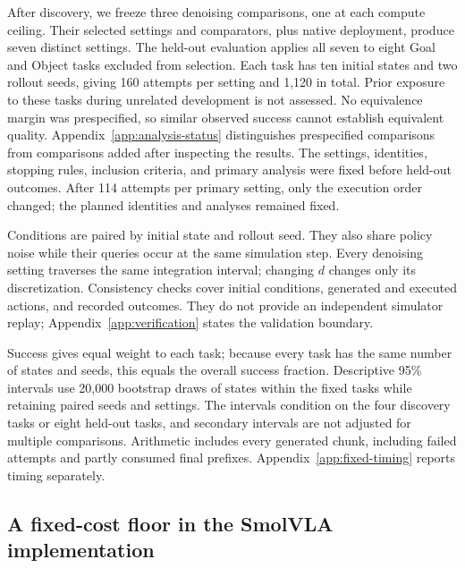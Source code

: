 \documentclass{article}
\begin{document}
After discovery, we freeze three denoising comparisons, one at each compute
ceiling. Their selected settings and comparators, plus native deployment, produce
seven distinct settings. The held-out evaluation applies all seven to eight Goal and
Object tasks excluded from selection. Each task has ten initial states and two
rollout seeds, giving 160 attempts per setting and 1,120 in total. Prior exposure
to these tasks during unrelated development is not assessed. No equivalence
margin was prespecified, so similar observed success cannot establish equivalent
quality. Appendix~\ref{app:analysis-status} distinguishes prespecified
comparisons from comparisons added after inspecting the results. The settings,
identities, stopping rules, inclusion criteria, and primary analysis were fixed
before held-out outcomes. After 114 attempts per primary setting, only the
execution order changed; the planned identities and analyses remained fixed.

Conditions are paired by initial state and rollout seed. They also share policy
noise while their queries occur at the same simulation step. Every denoising
setting traverses the same integration interval; changing $d$ changes only its
discretization. Consistency checks cover initial conditions, generated and executed
actions, and recorded outcomes. They do not provide an independent simulator
replay; Appendix~\ref{app:verification} states the validation boundary.

Success gives equal weight to each task; because every task has the same number
of states and seeds, this equals the overall success fraction. Descriptive 95\%
intervals use 20,000 bootstrap draws of states within the fixed tasks while
retaining paired seeds and settings. The intervals condition on the four
discovery tasks or eight held-out tasks, and secondary intervals are not
adjusted for multiple comparisons. Arithmetic includes every generated chunk,
including failed attempts and partly consumed final prefixes. Appendix~\ref{app:fixed-timing}
reports timing separately.

\subsection{A fixed-cost floor in the SmolVLA implementation}
\label{sec:fixed-cost-floor}
\end{document}
